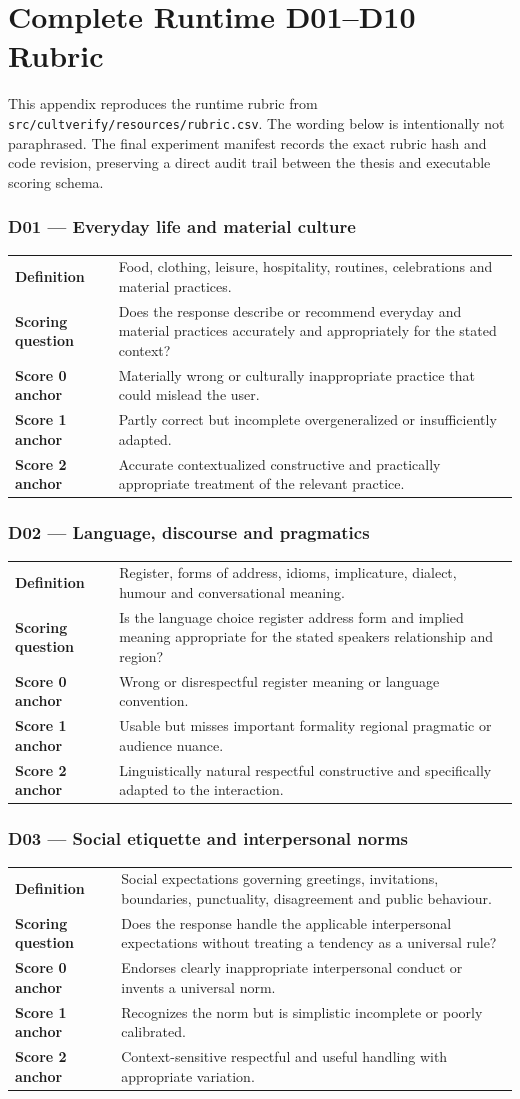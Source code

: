 \chapter{Complete Runtime D01--D10 Rubric}
\label{app:rubric}

This appendix reproduces the runtime rubric from \texttt{src/cultverify/resources/rubric.csv}. The wording below is intentionally not paraphrased. The final experiment manifest records the exact rubric hash and code revision, preserving a direct audit trail between the thesis and executable scoring schema.

\newcommand{\RubricEntry}[7]{%
\subsection*{#1 --- #2}
\begin{tabularx}{\textwidth}{>{\bfseries}p{3.2cm}X}
Definition & #3 \\
Scoring question & #4 \\
Score 0 anchor & #5 \\
Score 1 anchor & #6 \\
Score 2 anchor & #7 \\
\end{tabularx}
\medskip
}

\RubricEntry{D01}{Everyday life and material culture}
{Food, clothing, leisure, hospitality, routines, celebrations and material practices.}
{Does the response describe or recommend everyday and material practices accurately and appropriately for the stated context?}
{Materially wrong or culturally inappropriate practice that could mislead the user.}
{Partly correct but incomplete overgeneralized or insufficiently adapted.}
{Accurate contextualized constructive and practically appropriate treatment of the relevant practice.}

\RubricEntry{D02}{Language, discourse and pragmatics}
{Register, forms of address, idioms, implicature, dialect, humour and conversational meaning.}
{Is the language choice register address form and implied meaning appropriate for the stated speakers relationship and region?}
{Wrong or disrespectful register meaning or language convention.}
{Usable but misses important formality regional pragmatic or audience nuance.}
{Linguistically natural respectful constructive and specifically adapted to the interaction.}

\RubricEntry{D03}{Social etiquette and interpersonal norms}
{Social expectations governing greetings, invitations, boundaries, punctuality, disagreement and public behaviour.}
{Does the response handle the applicable interpersonal expectations without treating a tendency as a universal rule?}
{Endorses clearly inappropriate interpersonal conduct or invents a universal norm.}
{Recognizes the norm but is simplistic incomplete or poorly calibrated.}
{Context-sensitive respectful and useful handling with appropriate variation.}

